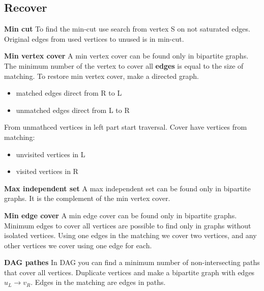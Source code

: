 \subsection{Recover}
\textbf{Min cut}
To find the min-cut use search from vertex S on not saturated edges. 
Original edges from used vertices to unused is in min-cut.

\textbf{Min vertex cover}
A min vertex cover can be found only in bipartite graphs. 
The minimum number of the vertex to cover all \textbf{edges} is equal to the size of matching. 
To restore min vertex cover, make a directed graph.
\begin{itemize}
\setlength\itemsep{0em}
\item matched edges direct from R to L
\item unmatched edges direct from L to R
\end{itemize}

From unmathced vertices in left part start traversal.
Cover have vertices from matching:
\begin{itemize}
\setlength\itemsep{0em}
\item unvisited vertices in L 
\item visited vertices in R
\end{itemize}

\textbf{Max independent set}
A max independent set can be found only in bipartite graphs. 
It is the complement of the min vertex cover.

\textbf{Min edge cover}
A min edge cover can be found only in bipartite graphs. 
Minimum edges to cover all vertices are possible to find only in graphs without isolated vertices. 
Using one edges in the matching we cover two vertices, 
and any other vertices we cover using one edge for each. 

\textbf{DAG pathes}
In DAG you can find a minimum number of non-intersecting paths that cover all vertices. 
Duplicate vertices and make a bipartite graph with edges $u_L \rightarrow v_R$. 
Edges in the matching are edges in paths.
